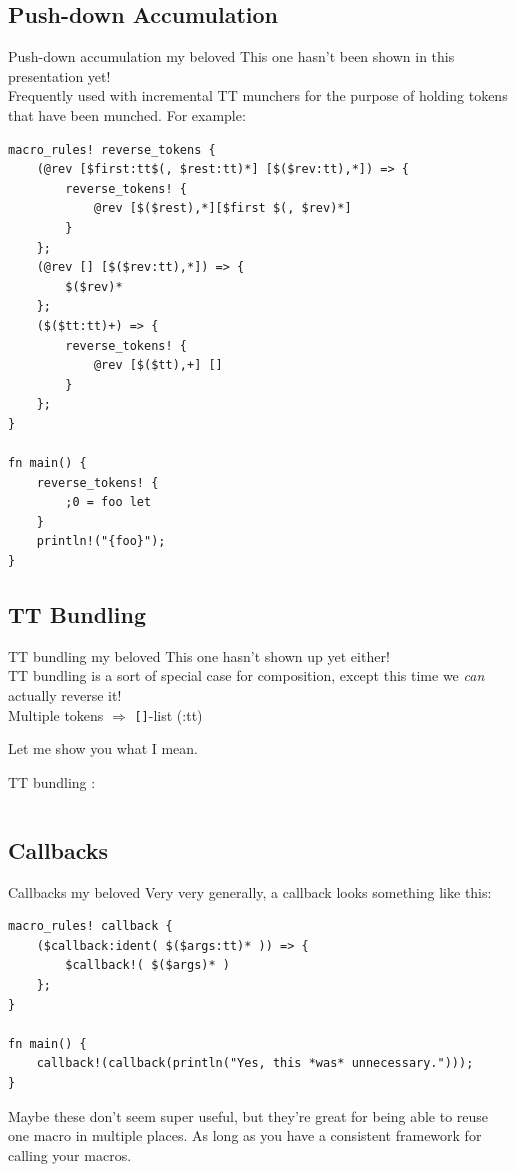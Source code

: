 \documentclass{beamer}
\newcommand{\fragspec}[1]{{\color{lightgrey}:}{\color{fragspeccolor}#1}}
\begin{document}
	\subsection{Push-down Accumulation}
	\begin{frame}[fragile]{Push-down accumulation my beloved}
		This one hasn't been shown in this presentation yet! \\

		Frequently used with incremental TT munchers for the purpose of holding tokens that have
		been munched. For example:
		\begin{verbatim}
macro_rules! reverse_tokens {
	(@rev [$first:tt$(, $rest:tt)*] [$($rev:tt),*]) => {
		reverse_tokens! {
			@rev [$($rest),*][$first $(, $rev)*]
		}
	};
	(@rev [] [$($rev:tt),*]) => {
		$($rev)*
	};
	($($tt:tt)+) => {
		reverse_tokens! {
			@rev [$($tt),+] []
		}
	};
}

fn main() {
	reverse_tokens! {
		;0 = foo let
	}
	println!("{foo}");
}
		\end{verbatim}
	\end{frame}

	\subsection{TT Bundling}
	\begin{frame}[fragile]{TT bundling my beloved}
		This one hasn't shown up yet either! \\

		TT bundling is a sort of special case for composition, except this time we \textit{can}
		actually reverse it! \\

		Multiple tokens $\Rightarrow$ \texttt{[]}-list (\fragspec{tt})

		Let me show you what I mean.
	\end{frame}

	\begin{frame}[fragile]{TT bundling}
		:
		\inputminted[autogobble, linenos]{rust}{../tt-bundling/src/main.rs}
	\end{frame}

	\subsection{Callbacks}
	\begin{frame}[fragile]{Callbacks my beloved}
		Very very generally, a callback looks something like this:

		\begin{verbatim}
macro_rules! callback {
	($callback:ident( $($args:tt)* )) => {
		$callback!( $($args)* )
	};
}

fn main() {
	callback!(callback(println("Yes, this *was* unnecessary.")));
}
		\end{verbatim}

		\pause

		Maybe these don't seem super useful, but they're great for being able to reuse one macro in
		multiple places.\pause{} As long as you have a consistent framework for calling your macros.
	\end{frame}
\end{document}
